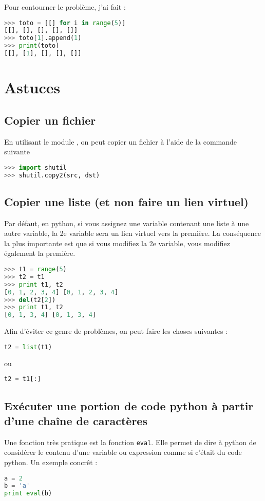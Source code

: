 \documentclass[a4paper,twoside]{article}
\begin{document}
Pour contourner le problème, j'ai fait :
\begin{lstlisting}[language=python]
>>> toto = [[] for i in range(5)]
[[], [], [], [], []]
>>> toto[1].append(1)
>>> print(toto)
[[], [1], [], [], []]
\end{lstlisting}

\section{Astuces}
\subsection{Copier un fichier}
En utilisant le module , on peut copier un fichier à l'aide de la commande suivante 
\begin{lstlisting}[language=python]
>>> import shutil
>>> shutil.copy2(src, dst)
\end{lstlisting}

\subsection{Copier une liste (et non faire un lien virtuel)}
Par défaut, en python, si vous assignez une variable contenant une liste à une autre variable, la 2e variable sera un lien virtuel vers la première. La conséquence la plus importante est que si vous modifiez la 2e variable, vous modifiez également la première.

\begin{exemple}
\begin{lstlisting}[language=python]
>>> t1 = range(5)
>>> t2 = t1
>>> print t1, t2
[0, 1, 2, 3, 4] [0, 1, 2, 3, 4]
>>> del(t2[2])
>>> print t1, t2
[0, 1, 3, 4] [0, 1, 3, 4]
\end{lstlisting}
\end{exemple}

Afin d'éviter ce genre de problèmes, on peut faire les choses suivantes :
\begin{lstlisting}[language=python]
t2 = list(t1)
\end{lstlisting}
ou
\begin{lstlisting}[language=python]
t2 = t1[:]
\end{lstlisting}

\subsection{Exécuter une portion de code python à partir d'une chaîne de caractères}
Une fonction très pratique est la fonction \texttt{eval}. Elle permet de dire à python de considérer le contenu d'une variable ou expression comme si c'était du code python. Un exemple concrêt :
\begin{lstlisting}[language=python]
a = 2
b = 'a'
print eval(b)
\end{lstlisting}
\end{document}
